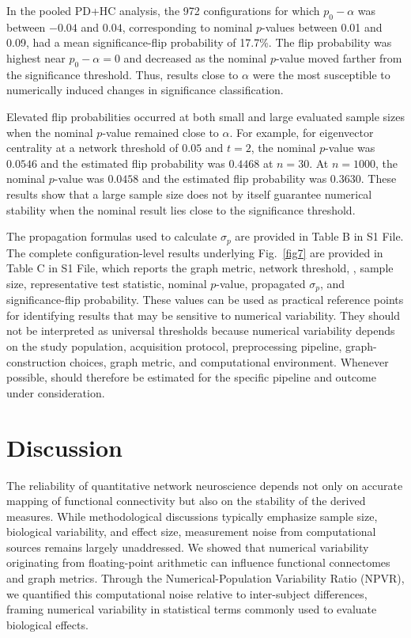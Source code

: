 In the pooled PD+HC analysis, the 972 configurations for which
\(p_0-\alpha\) was between \(-0.04\) and \(0.04\), corresponding to nominal
\(p\)-values between 0.01 and 0.09, had a mean significance-flip probability
of 17.7\%. 
The flip probability was highest near
\(p_0-\alpha=0\) and decreased as the nominal \(p\)-value moved farther from
the significance threshold. Thus, results close to \(\alpha\) were the most
susceptible to numerically induced changes in significance classification.

Elevated flip probabilities occurred at both small and large evaluated
sample sizes when the nominal \(p\)-value remained close to \(\alpha\). For
example, for eigenvector centrality at a network threshold of \(0.05\) and
\(t=2\), the nominal \(p\)-value was \(0.0546\) and the estimated flip
probability was \(0.4468\) at \(n=30\). At \(n=1000\), the nominal
\(p\)-value was \(0.0458\) and the estimated flip probability was \(0.3630\).
These results show that a large sample size does not by itself guarantee
numerical stability when the nominal result lies close to the significance
threshold.

The propagation formulas used to calculate \(\sigma_p\) are provided in
Table B in S1 File. The complete configuration-level
results underlying Fig.~\ref{fig7} are provided in Table C in S1 File,
which reports the graph metric, network threshold,
\npvratio{}, sample size, representative test statistic, nominal \(p\)-value,
propagated \(\sigma_p\), and significance-flip probability. These values can
be used as practical reference points for identifying results that may be
sensitive to numerical variability. They should not be interpreted as
universal thresholds because numerical variability depends on the study
population, acquisition protocol, preprocessing pipeline, graph-construction
choices, graph metric, and computational environment. Whenever possible,
\npvratio{} should therefore be estimated for the specific pipeline and
outcome under consideration.

\section{Discussion}
The reliability of quantitative network neuroscience depends not only on accurate mapping of functional connectivity but also on the stability of the derived measures. While methodological discussions typically emphasize sample size, biological variability, and effect size, measurement noise from computational sources remains largely unaddressed. We showed that numerical variability originating from floating-point arithmetic can influence functional connectomes and graph metrics. Through the Numerical-Population Variability Ratio (NPVR), we quantified this computational noise relative to inter-subject differences, framing numerical variability in statistical terms commonly used to evaluate biological effects.

